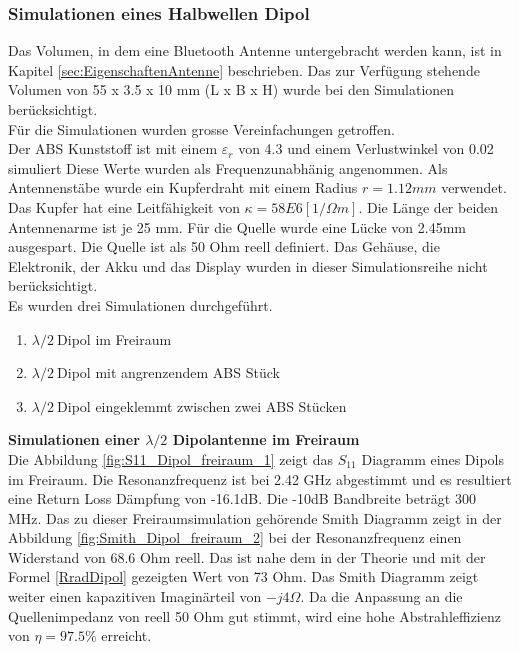 
\newpage
\subsubsection{Simulationen eines Halbwellen Dipol}\label{sim_lamda2_Dipol}

Das Volumen, in dem eine Bluetooth Antenne untergebracht werden kann, ist in Kapitel \ref{sec:EigenschaftenAntenne} beschrieben. Das zur Verfügung stehende Volumen von 55 x 3.5 x 10 mm (L x B x H) wurde bei den Simulationen berücksichtigt. \\
Für die Simulationen wurden grosse Vereinfachungen getroffen.\\
Der ABS Kunststoff ist mit einem $\varepsilon_r $ von 4.3 und einem Verlustwinkel von 0.02 simuliert Diese Werte wurden als Frequenzunabhänig angenommen. Als Antennenstäbe wurde ein  Kupferdraht mit einem Radius $r = 1.12 mm$ verwendet. Das Kupfer hat eine Leitfähigkeit von $\kappa=58E6 [1/\Omega m]$. Die Länge der beiden Antennenarme ist je 25 mm. Für die Quelle wurde eine Lücke von 2.45mm ausgespart. Die Quelle ist als 50 Ohm reell definiert. Das Gehäuse, die Elektronik, der Akku und das Display wurden in dieser Simulationsreihe nicht berücksichtigt.\\ 
Es wurden drei Simulationen durchgeführt.
\begin{enumerate}
\item  $\lambda/2 \ $Dipol im Freiraum
\item  $\lambda/2 \ $Dipol mit angrenzendem ABS Stück
\item  $\lambda/2 \ $Dipol eingeklemmt zwischen zwei ABS Stücken
\end{enumerate}

\textbf{Simulationen einer $\lambda/2$ Dipolantenne im Freiraum}\\
Die Abbildung \ref{fig:S11_Dipol_freiraum_1} zeigt das $S_{11}$ Diagramm eines Dipols im Freiraum. Die Resonanzfrequenz ist bei 2.42 GHz abgestimmt und es resultiert eine Return Loss Dämpfung von -16.1dB.  Die -10dB Bandbreite beträgt 300 MHz. Das zu dieser Freiraumsimulation gehörende Smith Diagramm zeigt in der Abbildung \ref{fig:Smith_Dipol_freiraum_2}  bei der Resonanzfrequenz einen Widerstand von 68.6 Ohm reell. Das ist nahe dem in der Theorie und mit der Formel \ref{RradDipol} gezeigten Wert von 73 Ohm. Das Smith Diagramm zeigt weiter einen kapazitiven  Imaginärteil von $-j4\Omega$. Da die Anpassung an die Quellenimpedanz von reell 50 Ohm gut stimmt, wird eine hohe Abstrahleffizienz von $\eta = 97.5 \% $ erreicht.



